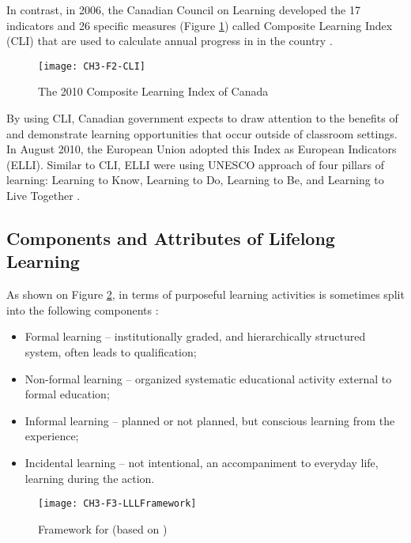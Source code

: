In contrast, in 2006, the Canadian Council on Learning developed the 17
indicators and 26 specific measures (Figure \ref{fig:cli2010}) called Composite
Learning Index (CLI) that are used to calculate annual progress in \LLLs in the
country \citep{CanadianCouncilonLearning2011}. 

\begin{figure}[htb]
\centering 
\texttt{[image: CH3-F2-CLI]}
\caption[The 2010 Composite Learning Index of Canada]{The 2010 Composite
Learning Index of Canada \citep{CanadianCouncilonLearning2011}}
\label{fig:cli2010}
\end{figure}

By using CLI, Canadian government expects to draw attention to the benefits of
\LLLs and demonstrate learning opportunities that occur outside of classroom
settings. In August 2010, the European Union adopted this Index as European
\LLLc Indicators (ELLI). Similar to CLI, ELLI were using UNESCO approach of four
pillars of learning: Learning to Know, Learning to Do, Learning to Be, and
Learning to Live Together \citep{ELLIDevelopmentTeam2010}.

\FloatBarrier

\subsection{Components and Attributes of Lifelong Learning}
As shown on Figure \ref{fig:lllfmwrk}, in terms of purposeful learning
activities \LLLs is sometimes split into the following components
\citep{Longworth2003, Tuijnman2002}:

\begin{itemize}
  \item Formal learning -- institutionally graded, and hierarchically structured
system, often leads to qualification;
  \item Non-formal learning -- organized systematic educational activity
  external to formal education;
  \item Informal learning -- planned or not planned, but conscious learning from
the experience;
  \item Incidental learning -- not intentional, an accompaniment to everyday
  life, learning during the action.
\end{itemize} 

\begin{figure}[htb]
\centering
\texttt{[image: CH3-F3-LLLFramework]}
\caption[Framework for \LLLc]{Framework for \LLLc (based on
\citealp[p.~11]{Divjak2004})}
\label{fig:lllfmwrk}
\end{figure}

